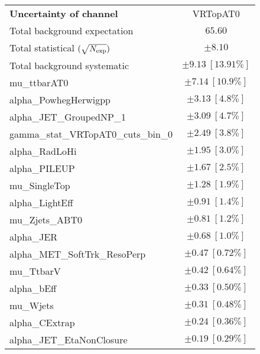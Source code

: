 
\begin{table}
\begin{center}
\setlength{\tabcolsep}{0.0pc}
\begin{tabular*}{\textwidth}{@{\extracolsep{\fill}}lc}
\noalign{\smallskip}\hline\noalign{\smallskip}
{\bf Uncertainty of channel}                                    & VRTopAT0            \\
\noalign{\smallskip}\hline\noalign{\smallskip}
Total background expectation             &  $65.60$       \\
\noalign{\smallskip}\hline\noalign{\smallskip}
Total statistical $(\sqrt{N_{\rm exp}})$              & $\pm 8.10$       \\
Total background systematic               & $\pm 9.13\ [13.91\%] $             \\
\noalign{\smallskip}\hline\noalign{\smallskip}
\noalign{\smallskip}\hline\noalign{\smallskip}
mu\_ttbarAT0         & $\pm 7.14\ [10.9\%] $       \\
alpha\_PowhegHerwigpp         & $\pm 3.13\ [4.8\%] $       \\
alpha\_JET\_GroupedNP\_1         & $\pm 3.09\ [4.7\%] $       \\
gamma\_stat\_VRTopAT0\_cuts\_bin\_0         & $\pm 2.49\ [3.8\%] $       \\
alpha\_RadLoHi         & $\pm 1.95\ [3.0\%] $       \\
alpha\_PILEUP         & $\pm 1.67\ [2.5\%] $       \\
mu\_SingleTop         & $\pm 1.28\ [1.9\%] $       \\
alpha\_LightEff         & $\pm 0.91\ [1.4\%] $       \\
mu\_Zjets\_ABT0         & $\pm 0.81\ [1.2\%] $       \\
alpha\_JER         & $\pm 0.68\ [1.0\%] $       \\
alpha\_MET\_SoftTrk\_ResoPerp         & $\pm 0.47\ [0.72\%] $       \\
mu\_TtbarV         & $\pm 0.42\ [0.64\%] $       \\
alpha\_bEff         & $\pm 0.33\ [0.50\%] $       \\
mu\_Wjets         & $\pm 0.31\ [0.48\%] $       \\
alpha\_CExtrap         & $\pm 0.24\ [0.36\%] $       \\
alpha\_JET\_EtaNonClosure         & $\pm 0.19\ [0.29\%] $       \\

\end{tabular*}
\end{center}
\end{table}
